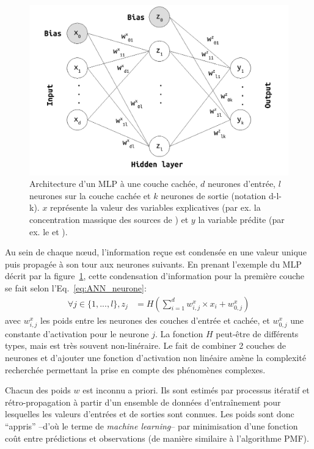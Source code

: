 \begin{figure}[ht]
    \centering
    \includegraphics[width=0.7\linewidth]{figures/chapter05/MLP_architecture.pdf}
    \caption{Architecture d'un MLP à une couche cachée, $d$ neurones d'entrée, $l$
    neurones sur la couche cachée et $k$ neurones de sortie (notation d-l-k). $x$
    représente la valeur des variables explicatives (par ex. la concentration massique des
    sources de \PMdix) et $y$ la variable prédite (par ex. le \POAAv{} et \PODTTv).}%
    \label{fig:MLP_architecture}
\end{figure}

Au sein de chaque nœud, l'information reçue est condensée en une valeur unique puis propagée à
son tour aux neurones suivants. En prenant l'exemple du MLP décrit par la
figure~\ref{fig:MLP_architecture}, cette condensation d'information pour la première
couche se fait selon l'Eq.~\ref{eq:ANN_neurone}:
\begin{align}
    \label{eq:ANN_neurone}
    \forall j \in \{1, ..., l\}, z_j &= H\left( \sum_{i=1}^d w^x_{i,j} \times x_i + w^x_{0,j} \right)
\end{align}
avec $w^x_{i,j}$ les poids entre les neurones des couches d'entrée et cachée, et
$w^x_{0,j}$ une constante d'activation pour le neurone $j$. La fonction $H$
peut-être de différents types, mais est très souvent non-linéraire. Le fait de combiner 2
couches de neurones et d'ajouter une fonction d'activation non linéaire amène la
complexité recherchée permettant la prise en compte des phénomènes complexes.

Chacun des poids $w$ est inconnu a priori. Ils sont estimés par processus itératif et
rétro-propagation à partir d'un ensemble de données d'entraînement pour lesquelles les
valeurs d'entrées et de sorties sont connues. Les poids sont donc ``appris'' --d'où le
terme de \textit{machine learning}-- par minimisation d'une fonction coût entre prédictions
et observations (de manière similaire à l'algorithme PMF).

